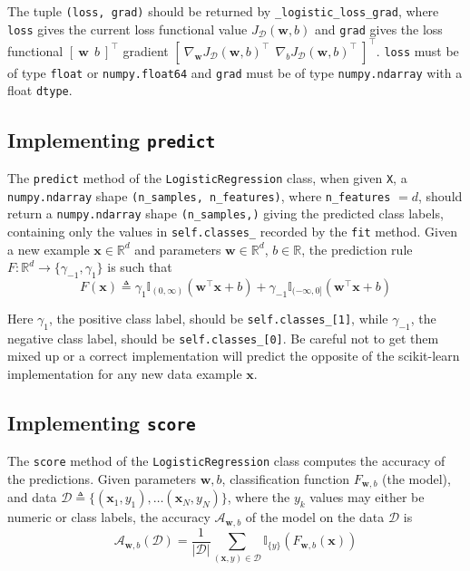 \documentclass{article}
\numberwithin{equation}{section}
\newcommand{\loglossgrad}{\texttt{\_logistic\_loss\_grad}}
\begin{document}
\medskip

The tuple \texttt{(loss, grad)} should be returned by \loglossgrad{}, where
\texttt{loss} gives the current loss functional value
$ J_\mathcal{D}(\mathbf{w}, b) $ and \texttt{grad} gives the loss functional
$ [ \ \mathbf{w} \ \ b \ ]^\top $ gradient
$ [ \ \nabla_\mathbf{w}J_\mathcal{D}(\mathbf{w}, b)^\top \ \
\nabla_bJ_\mathcal{D}(\mathbf{w}, b)^\top \ ]^\top $. \texttt{loss} must be of
type \texttt{float} or \texttt{numpy.float64} and \texttt{grad} must be of
type \texttt{numpy.ndarray} with a float \texttt{dtype}.

\subsection{Implementing \texttt{predict}}

The \texttt{predict} method of the \texttt{LogisticRegression} class, when
given \texttt{X}, a \texttt{numpy.ndarray} shape
\texttt{(n\_samples, n\_features)}, where \texttt{n\_features} $ = d $,
should return a \texttt{numpy.ndarray} shape \texttt{(n\_samples,)} giving the
predicted class labels, containing only the values in \texttt{self.classes\_}
recorded by the \texttt{fit} method. Given a new example $ \mathbf{x} \in
\mathbb{R}^d $ and parameters $\mathbf{w} \in \mathbb{R}^d $, $ b \in
\mathbb{R} $, the prediction rule $ F : \mathbb{R}^d \rightarrow
\{\gamma_{-1}, \gamma_1\} $ is such that
\begin{equation*}
    F(\mathbf{x}) \triangleq \gamma_1\mathbb{I}_{(0, \infty)}
        \left(\mathbf{w}^\top\mathbf{x} + b\right) +
        \gamma_{-1}\mathbb{I}_{(-\infty, 0]}
        \left(\mathbf{w}^\top\mathbf{x} + b\right)
\end{equation*}

Here $ \gamma_1 $, the positive class label, should be
\texttt{self.classes\_[1]}, while $ \gamma_{-1} $, the negative class label,
should be \texttt{self.classes\_[0]}. Be careful not to get them mixed up or
a correct implementation will predict the opposite of the scikit-learn
implementation for any new data example $ \mathbf{x} $.

\subsection{Implementing \texttt{score}}

The \texttt{score} method of the \texttt{LogisticRegression} class computes
the accuracy of the predictions. Given parameters $ \mathbf{w}, b $,
classification function $ F_{\mathbf{w}, b} $ (the model), and data
$ \mathcal{D} \triangleq \{(\mathbf{x}_1, y_1), \ldots (\mathbf{x}_N, y_N)\} $,
where the $ y_k $ values may either be numeric or class labels, the accuracy
$ \mathcal{A}_{\mathbf{w}, b} $ of the model on the data $ \mathcal{D} $ is
\begin{equation*}
    \mathcal{A}_{\mathbf{w}, b}(\mathcal{D}) = \frac{1}{|\mathcal{D}|}
        \sum_{(\mathbf{x}, y) \in \mathcal{D}}\mathbb{I}_{\{y\}}\left(
            F_{\mathbf{w}, b}(\mathbf{x})
        \right)
\end{equation*}
\end{document}

